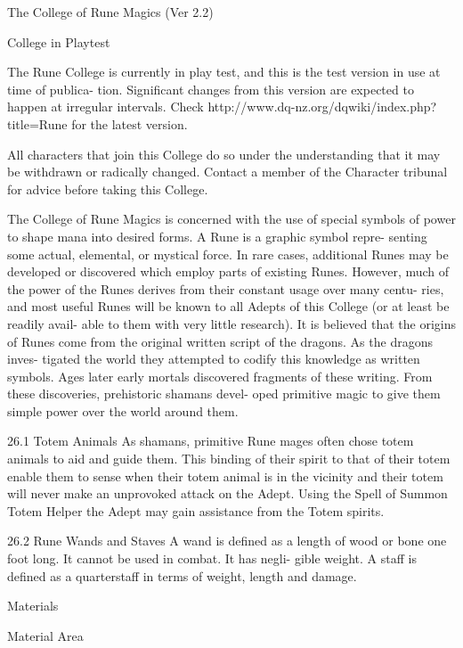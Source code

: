 \begin{Chapter}{The College of Rune Magics (Ver 2.2)}

College in Playtest 

The  Rune  College  is  currently  in  play  test,  and 
this is the test version in use at time of publica-
tion.  Significant  changes  from  this  version  are 
expected to happen at irregular intervals. Check  
http://www.dq-nz.org/dqwiki/index.php?title=Rune  
for the latest version. 

All characters that join this College do so under 
the understanding that it may be withdrawn or 
radically  changed.  Contact  a  member  of  the 
Character tribunal for advice before taking this 
College. 

The College of Rune Magics is concerned with the 
use of special symbols of power to shape mana into 
desired  forms.  A  Rune  is  a  graphic  symbol  repre-
senting  some  actual,  elemental,  or  mystical  force. 
In  rare  cases,  additional  Runes  may  be  developed 
or  discovered  which  employ  parts  of  existing 
Runes. However, much of the power of the Runes 
derives from their constant usage over many centu-
ries,  and  most  useful  Runes  will  be  known  to  all 
Adepts of this College (or at least be readily avail-
able to them with very little research). It is believed 
that  the  origins  of  Runes  come  from  the  original 
written script of the dragons. As the dragons inves-
tigated  the  world  they  attempted  to  codify  this 
knowledge  as  written  symbols.  Ages  later  early 
mortals  discovered  fragments  of  these  writing. 
From these discoveries, prehistoric shamans devel-
oped  primitive  magic  to  give  them  simple  power 
over the world around them. 

26.1 Totem Animals 
As  shamans,  primitive  Rune  mages  often  chose 
totem animals to aid and guide them. This binding 
of their spirit to that of their totem enable them to 
sense when their totem animal is in the vicinity and 
their  totem  will  never  make  an  unprovoked  attack 
on  the  Adept.  Using  the  Spell  of  Summon  Totem 
Helper  the  Adept  may  gain  assistance  from  the 
Totem spirits. 

26.2 Rune Wands and Staves 
A wand is defined as a length of wood or bone one 
foot long. It cannot be used in combat. It has negli-
gible weight. A staff is defined as a quarterstaff in 
terms of weight, length and damage. 

Materials 

Material  Area 


\end{Chapter}
